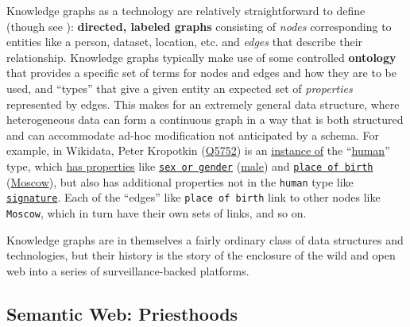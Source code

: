 Knowledge graphs as a technology are relatively straightforward to
define \cite{chaudhriKnowledgeGraphsIntroduction2022, hitzlerReviewSemanticWeb2021, yanRetrospectiveKnowledgeGraphs2018, bergmanCommonSenseView2019}  (though see \cite{ehrlingerDefinitionKnowledgeGraphs2016} ): \textbf{directed, labeled
graphs} consisting of \emph{nodes} corresponding to entities like a
person, dataset, location, etc. and \emph{edges} that describe their
relationship. Knowledge graphs
typically make use of some controlled \textbf{ontology} that provides a
specific set of terms for nodes and edges and how they are to be used,
and ``types'' that give a given entity an expected set of
\emph{properties} represented by edges. This makes for an extremely
general data structure, where heterogeneous data can form a continuous
graph in a way that is both structured and can accommodate ad-hoc
modification not anticipated by a schema. For example, in Wikidata,
Peter Kropotkin (\href{https://www.wikidata.org/wiki/Q5752}{Q5752}) is
an \href{https://www.wikidata.org/wiki/Property:P31}{instance of} the
``\href{https://www.wikidata.org/wiki/Q5}{human}'' type, which
\href{https://www.wikidata.org/wiki/Property:P1963}{has properties} like
\href{https://www.wikidata.org/wiki/Property:P21}{\texttt{sex\ or\ gender}}
(\href{https://www.wikidata.org/wiki/Q6581097}{male}) and
\href{https://www.wikidata.org/wiki/Property:P19}{\texttt{place\ of\ birth}}
(\href{https://www.wikidata.org/wiki/Q649}{Moscow}), but also has
additional properties not in the \texttt{human} type like
\href{https://www.wikidata.org/wiki/Property:P109}{\texttt{signature}}.
Each of the ``edges'' like \texttt{place\ of\ birth} link to other nodes
like \texttt{Moscow}, which in turn have their own sets of links, and so
on.

Knowledge graphs are in themselves a fairly ordinary class of data
structures and technologies, but their history is the story of the
enclosure of the wild and open web into a series of surveillance-backed
platforms.

\hypertarget{semantic-web-priesthoods}{%
\subsection{Semantic Web:
Priesthoods}\label{semantic-web-priesthoods}}


